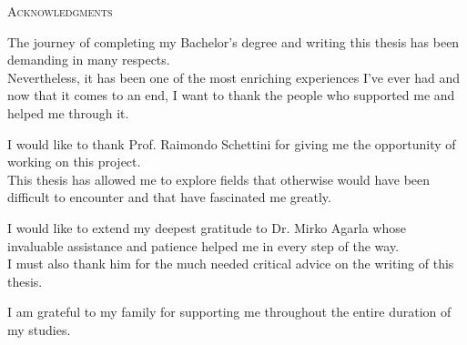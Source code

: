 \begin{center}
  \textsc{Acknowledgments}
\end{center}
%
\noindent
%
The journey of completing my Bachelor's degree and writing this thesis has been demanding in many respects.\\
Nevertheless, it has been one of the most enriching experiences I've ever had and now that it comes to an end, I want to thank the people who supported me and helped me through it.

\vspace{2mm}
I would like to thank Prof. Raimondo Schettini for giving me the opportunity of working on this project.\\
This thesis has allowed me to explore fields that otherwise would have been difficult to encounter and that have fascinated me greatly.

\vspace{2mm}
I would like to extend my deepest gratitude to Dr. Mirko Agarla whose invaluable assistance and patience helped me in every step of the way.\\
I must also thank him for the much needed critical advice on the writing of this thesis.

\vspace{2mm}
I am grateful to my family for supporting me throughout the entire duration of my studies.

